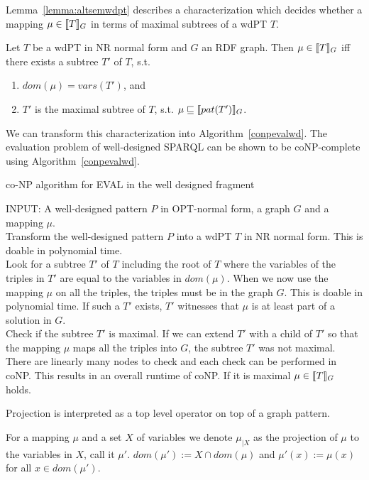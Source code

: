 Lemma~\ref{lemma:altsemwdpt} describes a characterization which decides whether
a mapping $\mu \in \llbracket T\rrbracket_G$ in terms of maximal subtrees of a wdPT $T$.  

\begin{lemma}\label{lemma:altsemwdpt}
	Let $T$ be a wdPT in NR normal form and $G$ an RDF graph. Then $\mu \in
	\llbracket T\rrbracket_G$ iff there exists a subtree $T'$ of $T$, s.t. 
	\begin{enumerate}
		\item  $dom(\mu) = vars(T')$, and
		\item $T'$ is the maximal subtree of $T$, s.t. $\mu \sqsubseteq \llbracket
			pat(T') \rrbracket_G$.
	\end{enumerate}
\end{lemma}

We can transform this characterization into Algorithm~\ref{conpevalwd}.
The evaluation problem of well-designed SPARQL can be shown to be coNP-complete using
Algorithm~\ref{conpevalwd}. 
\begin{algorithm}
	\caption{co-NP algorithm for EVAL in the well designed
	fragment~\cite{letelier2012static}}
	\label{conpevalwd}
	INPUT: A well-designed pattern $P$ in OPT-normal form, a graph $G$ and a mapping
	$\mu$.\\
	Transform the well-designed pattern $P$ into a wdPT $T$ in NR normal form. This is doable in
	polynomial time. \\
	Look for a subtree $T'$ of $T$ including the root of $T$ where the
	variables of the triples in $T'$ are equal to the variables in $dom(\mu)$. 
	When we now use the mapping $\mu$ on all the triples, the triples must
	be in the graph $G$. This is doable in polynomial time. If such a $T'$
	exists, $T'$ witnesses that $\mu$ is at least part of a solution in
	$G$.\\
	Check if the subtree $T'$ is maximal. If we can
	extend $T'$ with a child of $T'$ so that the mapping $\mu$ maps
	all the triples into $G$, the subtree $T'$ was not maximal. 
	There are linearly many nodes to check and each check can be performed in coNP.
	This results in an overall runtime of coNP.
	If it is maximal $\mu \in \llbracket T \rrbracket_G$ holds.
\end{algorithm}

Projection is interpreted as a top level operator on top of a graph pattern.
\begin{definition}
For a mapping $\mu$ and a set $X$ of variables we denote $\mu_{|X}$ as the
projection of $\mu$ to the variables in $X$, call it $\mu'$. $dom(\mu'):=X \cap
dom(\mu)$ and $\mu'(x) := \mu(x)$ for all $x \in dom(\mu')$.
\end{definition}

